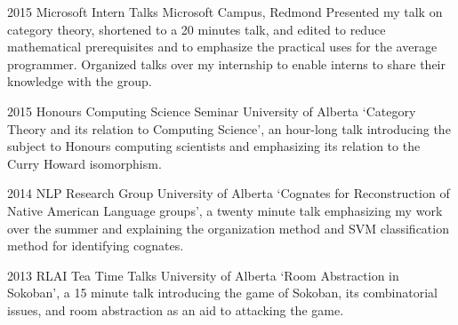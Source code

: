 \documentclass{friggeri-cv} %
\begin{document}
\begin{entrylist}


\entry
{2015}
{Microsoft Intern Talks}
{Microsoft Campus, Redmond}
{Presented my talk on category theory, shortened to a 20 minutes talk, and edited to reduce mathematical prerequisites and to emphasize the practical uses for the average programmer. Organized talks over my internship to enable interns to share their knowledge with the group.}


\entry
{2015}
{Honours Computing Science Seminar}
{University of Alberta}
{`Category Theory and its relation to Computing Science', an hour-long talk introducing the subject to Honours computing scientists and emphasizing its relation to the Curry Howard isomorphism.}


\entry
{2014}
{NLP Research Group}
{University of Alberta}
{`Cognates for Reconstruction of Native American Language groups', a twenty minute talk emphasizing my work over the summer and explaining the organization method and SVM classification method for identifying cognates.}


\entry
{2013}
{RLAI Tea Time Talks}
{University of Alberta}
{`Room Abstraction in Sokoban', a 15 minute talk introducing the game of Sokoban, its combinatorial issues, and room abstraction as an aid to attacking the game.}

\end{entrylist}




\end{document}
